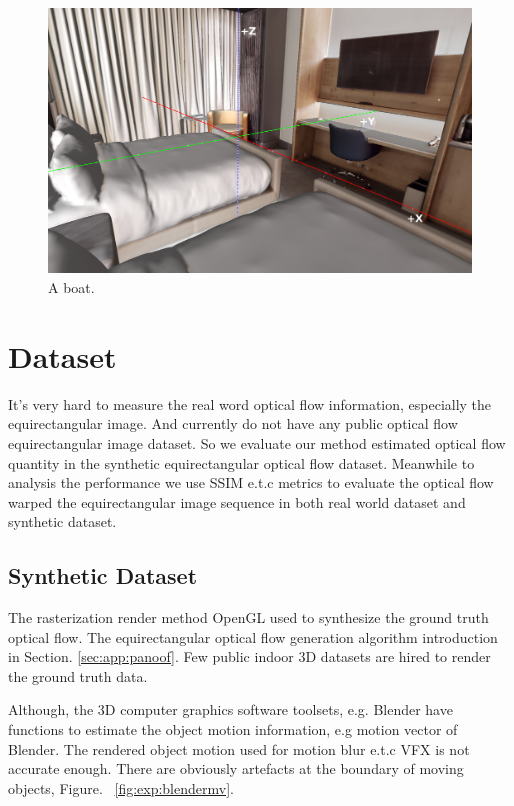 \begin{figure}[hbt!]
	\centering
	\includegraphics[width=\linewidth]{images/synthetic_optical_flow/coord_hotel_00.png}
	\caption{A boat.}
	\label{fig:approach:geometry_cs}
\end{figure}



\section{Dataset}\label{sec:exp:data}

It's very hard to measure the real word optical flow information, especially the equirectangular image. 
And currently do not have any public optical flow equirectangular image dataset.
So we evaluate our method estimated optical flow quantity in the synthetic equirectangular optical flow dataset.
Meanwhile to analysis the performance we use SSIM e.t.c metrics to evaluate the optical flow warped the equirectangular image sequence in both real world dataset and synthetic dataset.


\subsection{Synthetic Dataset}\label{sec:exp:data:syn}

The rasterization render method OpenGL used to synthesize the ground truth optical flow.
The equirectangular optical flow generation algorithm introduction in Section. \ref{sec:app:panoof}.
Few public indoor 3D datasets are hired to render the ground truth data.

Although, the 3D computer graphics software toolsets, e.g. Blender have functions to estimate the object motion information, e.g motion vector of Blender. 
The rendered object motion used for motion blur e.t.c VFX is not accurate enough. 
There are obviously artefacts at the boundary of moving objects, Figure. ~\ref{fig:exp:blendermv}. 

